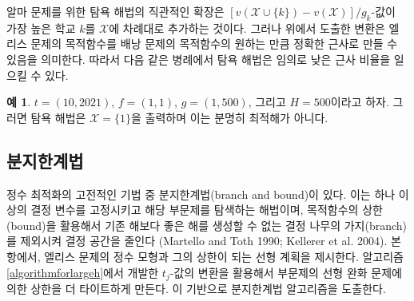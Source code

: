 \documentclass[11pt]{article} %
\newif\ifen
\theoremstyle{definition}
\newtheorem{example}{Example}
\theoremstyle{definition}
\newtheorem{example}{예}
\begin{document}
\ifen 
An intuitive extension of the greedy algorithm for Alma's problem is to iteratively add to $\mathcal{X}$ the school $k$ for which $[ v(\mathcal{X}\cup\{k\}) - v(\mathcal{X}) ] / g_k$ is largest. However, the construction above shows that the objective function of Ellis's problem can approximate that of a knapsack problem with arbitrary precision. Therefore, in pathological examples such as the following, the greedy algorithm can achieve an arbitrarily small approximation ratio. 
\else
알마 문제를 위한 탐욕 해법의 직관적인 확장은 $[ v(\mathcal{X}\cup\{k\}) - v(\mathcal{X}) ] / g_k$-값이 가장 높은 학교 $k$를  $\mathcal{X}$에 차례대로 추가하는 것이다. 그러나 위에서 도출한 변환은 엘리스 문제의 목적함수를 배낭 문제의 목적함수의 원하는 만큼 정확한 근사로 만들 수 있음을 의미한다. 따라서 다음 같은 병례에서 탐욕 해법은 임의로 낮은 근사 비율을 일으킬 수 있다.
\fi
\begin{example}
\ifen
Let $t = (10, 2021)$, $f = (1, 1)$, $g = (1, 500)$, and $H = 500$. Then the greedy approximation algorithm produces the clearly inoptimal solution $\mathcal{X} = \{1\}$. 
\else
 $t = (10, 2021)$, $f = (1, 1)$, $g = (1, 500)$, 그리고 $H = 500$이라고 하자. 그러면 탐욕 해법은 $\mathcal{X} = \{1\}$을 출력하며 이는 분명히 최적해가 아니다.
\fi
\end{example} 

\ifen \subsection{Branch-and-bound algorithm} \else \subsection{분지한계법} \fi
\ifen 
A traditional approach to integer optimization problems is the branch-and-bound framework, which generates subproblems in which the values of one or more decision variables are fixed and uses an upper bound on the objective function to exclude, or \emph{fathom,} branches of the decision tree that cannot yield a solution better than the best solution on hand (Martello and Toth 1990; Kellerer et al. 2004). In this subsection, we present an integer formulation of Ellis's problem and a linear program (LP) that bounds the objective value from above. We tighten the LP bound for specific subproblems by reusing the conditional transformation of the $t_j$-values from Algorithm \ref{algorithmforlargeh}. A branch-and-bound routine emerges naturally from these ingredients.
\else
정수 최적화의 고전적인 기법 중 분지한계법(branch and bound)이 있다. 이는 하나 이상의 결정 변수를 고정시키고 해당 부문제를 탐색하는 해법이며, 목적함수의 상한(bound)을 활용해서 기존 해보다 좋은 해를 생성할 수 없는 결정 나무의 가지(branch)를 제외시켜 결정 공간을 줄인다 (Martello and Toth 1990; Kellerer et al. 2004). 본 항에서, 엘리스 문제의 정수 모형과 그의 상한이 되는 선형 계획을 제시한다. 알고리즘 \ref{algorithmforlargeh}에서 개발한 $t_j$-값의 변환을 활용해서 부문제의 선형 완화 문제에 의한 상한을 더 타이트하게 만든다. 이 기반으로 분지한계법 알고리즘을 도출한다.
\fi
\end{document}
